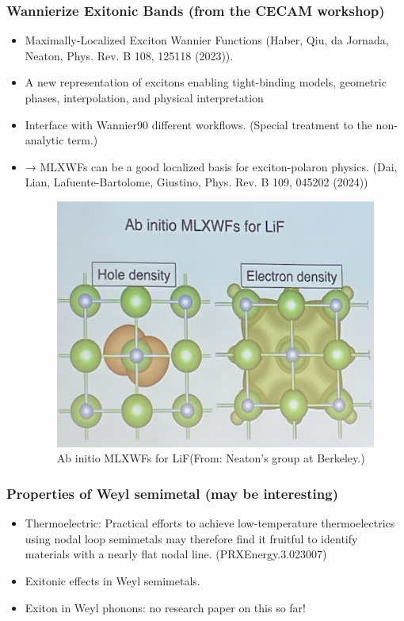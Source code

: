 \documentclass{CustomBeamer}
\begin{document}
        \begin{frame}
            \frametitle{Wannierize Exitonic Bands (from the CECAM workshop) }
            \begin{itemize}
                \item   Maximally-Localized Exciton Wannier Functions (Haber, Qiu, da Jornada, Neaton, Phys. Rev. B 108, 125118 (2023)).
                \item A new representation of excitons enabling tight-binding models, geometric phases, interpolation, and physical interpretation
                \item Interface with Wannier90 different workflows. (Special treatment to the non-analytic term.)
                \item → MLXWFs can be a good localized basis for exciton-polaron physics. (Dai, Lian, Lafuente-Bartolome, Giustino, Phys. Rev. B 109, 045202 (2024))
                \begin{figure}
                    \centering
                    \includegraphics[width=0.3\linewidth]{exitonwannier.png}
                    \caption{Ab initio MLXWFs for LiF(From: Neaton's group at Berkeley.)            }
                \end{figure}
            \end{itemize}
            \end{frame}

            \begin{frame}
                \frametitle{Properties of Weyl semimetal (may be interesting)}
                \begin{itemize}
                   \item Thermoelectric: Practical efforts to achieve low-temperature thermoelectrics using nodal loop semimetals may therefore find it fruitful to identify materials with a nearly flat nodal line. (PRXEnergy.3.023007)   
                   \item Exitonic effects in Weyl semimetals.
                   \item Exiton in Weyl phonons: no research paper on this so far!
                \end{itemize}
            \end{frame}
\end{document}
